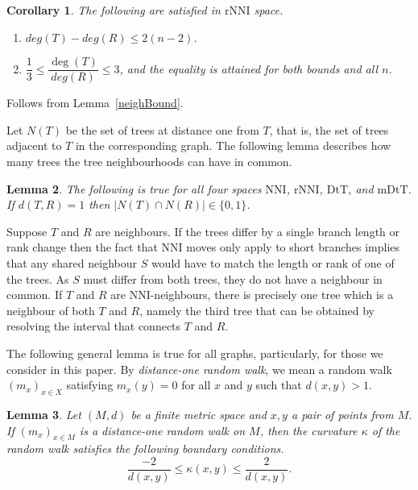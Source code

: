 \documentclass{amsart}
\newtheorem{lemma}{Lemma}
\newtheorem{corollary}[lemma]{Corollary}
\newcommand{\dts}{\mathrm{DtT}}
\newcommand{\nni}{\mathrm{NNI}}
\newcommand{\rnni}{\mathrm{rNNI}}
\newcommand{\mdts}{\mathrm{mDtT}}
\begin{document}
\begin{corollary}\label{degreeBoundsNNI}
The following are satisfied in $\rnni$ space.
\begin{enumerate}[(1)]
\item $deg(T)-deg(R) \leq 2(n-2)$.
\item $\dfrac13 \leq \dfrac{\deg(T)}{deg(R)} \leq 3$, and the equality is attained for both bounds and all $n$.
\end{enumerate}
\end{corollary}

\proof
Follows from Lemma~\ref{neighBound}.
\endproof

Let $N(T)$ be the set of trees at distance one from $T$, that is, the set of trees adjacent to $T$ in the corresponding graph.
The following lemma describes how many trees the tree neighbourhoods can have in common.

\begin{lemma}\label{intersecNeighb}
The following is true for all four spaces $\nni$, $\rnni$, $\dts$, and $\mdts$.
If $d(T,R) = 1$ then $|N(T)\cap N(R)|\in\{0,1\}$.
\end{lemma}

\proof
Suppose $T$ and $R$ are neighbours.
If the trees differ by a single branch length or rank change then the fact that NNI moves only apply to short branches implies that any shared neighbour $S$ would have to match the length or rank of one of the trees. As $S$ must differ from both trees, they do not have a neighbour in common.
If $T$ and $R$ are NNI-neighbours, there is precisely one tree which is a neighbour of both $T$ and $R$, namely the third tree that can be obtained by resolving the interval that connects $T$ and $R$.
\endproof

The following general lemma is true for all graphs, particularly, for those we consider in this paper.
By {\em distance-one random walk}, we mean a random walk $(m_x)_{x \in X}$ satisfying $m_x(y) = 0$ for all $x$ and $y$ such that $d(x,y) > 1$.

\begin{lemma}\label{curvBoundGeneral}
Let $(M,d)$ be a finite metric space and $x,y$ a pair of points from $M$. If
$(m_x)_{x \in M}$ is a distance-one random walk on $M$, then the curvature
$\kappa$ of the random walk satisfies the following boundary conditions.
\[
\dfrac{-2}{d(x,y)} \leq \kappa(x,y) \leq \dfrac{2}{d(x,y)}.
\]
\end{lemma}
\end{document}
